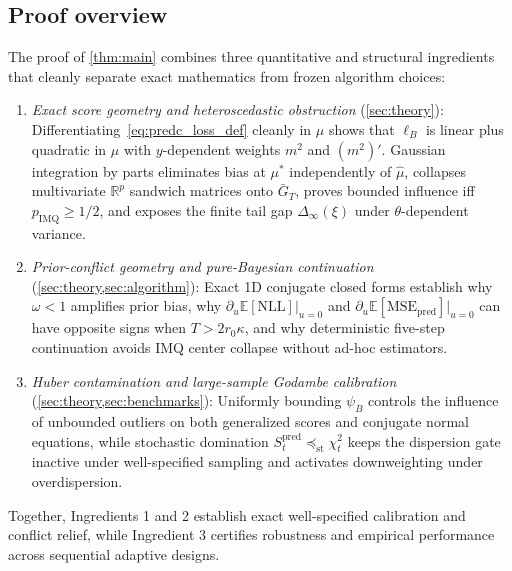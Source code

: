 \documentclass[11pt,a4paper,reqno]{amsart}
\theoremstyle{definition}
\theoremstyle{remark}
\newcommand{\R}{\mathbb{R}}
\newcommand{\E}{\mathbb{E}}
\begin{document}
\subsection{Proof overview}\label{sec:overview}
The proof of \cref{thm:main} combines three quantitative and structural ingredients that cleanly separate exact mathematics from frozen algorithm choices:
\begin{enumerate}[label=\arabic*.]
\item \emph{Exact score geometry and heteroscedastic obstruction} (\cref{sec:theory}): Differentiating~\eqref{eq:predc_loss_def} cleanly in $\mu$ shows that $\ell_B$ is linear plus quadratic in $\mu$ with $y$-dependent weights $m^2$ and $(m^2)'$. Gaussian integration by parts eliminates bias at $\mu^*$ independently of $\hat{\mu}$, collapses multivariate $\R^p$ sandwich matrices onto $\bar{G}_T$, proves bounded influence iff $p_{\mathrm{IMQ}} \ge 1/2$, and exposes the finite tail gap $\Delta_\infty(\xi)$ under $\theta$-dependent variance.
\item \emph{Prior-conflict geometry and pure-Bayesian continuation} (\cref{sec:theory,sec:algorithm}): Exact 1D conjugate closed forms establish why $\omega < 1$ amplifies prior bias, why $\partial_u \E[\mathrm{NLL}]|_{u=0}$ and $\partial_u \E[\mathrm{MSE}_{\mathrm{pred}}]|_{u=0}$ can have opposite signs when $T > 2 r_0 \kappa$, and why deterministic five-step continuation avoids IMQ center collapse without ad-hoc estimators.
\item \emph{Huber contamination and large-sample Godambe calibration} (\cref{sec:theory,sec:benchmarks}): Uniformly bounding $\psi_B$ controls the influence of unbounded outliers on both generalized scores and conjugate normal equations, while stochastic domination $S_t^{\mathrm{pred}} \preceq_{\mathrm{st}} \chi^2_t$ keeps the dispersion gate inactive under well-specified sampling and activates downweighting under overdispersion.
\end{enumerate}
Together, Ingredients 1 and 2 establish exact well-specified calibration and conflict relief, while Ingredient 3 certifies robustness and empirical performance across sequential adaptive designs.
\end{document}
